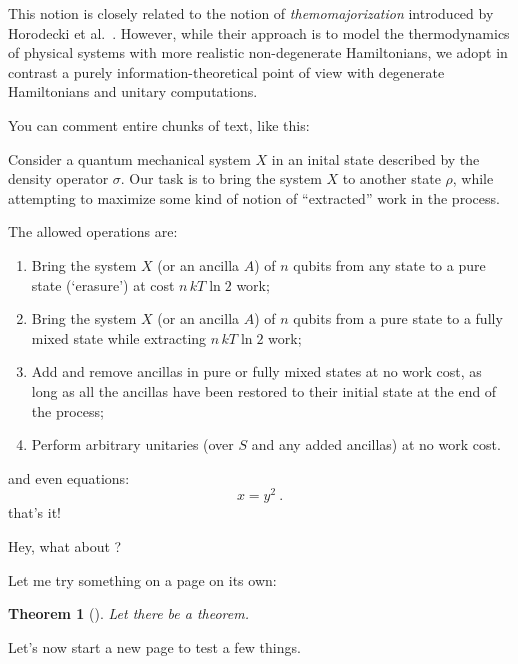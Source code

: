 \documentclass[10pt,a4paper,aps,reprint,notitlepage,nofootinbib]{revtex4-1}
\newtheorem{theorem}{Theorem}
\begin{document}
This notion is closely related to the notion of {\em themomajorization}
introduced by Horodecki et al.~\cite{Horodecki2013_ThermoMaj}. However, while
their approach is to model the thermodynamics of physical systems with more
realistic non-degenerate Hamiltonians, we adopt in contrast a purely
information-theoretical point of view with degenerate Hamiltonians and unitary
computations.

\phf* You can comment entire chunks of text, like this:

Consider a quantum mechanical system $X$ in an inital state described by the
density operator $\sigma$.  
 Our task is to bring the system $X$ to another state $\rho$,
while attempting to maximize some kind of notion of ``extracted'' work in the
process.

The allowed operations are:
\begin{enumerate}[label=(\alph*)]
\item Bring the system $X$ (or an ancilla $A$) of $n$ qubits from any state to a pure state (`erasure') at
  cost $n\,kT\ln 2$ work;
\item Bring the system $X$ (or an ancilla $A$) of $n$ qubits from a pure state to a fully mixed state while
  extracting $n\,kT\ln 2$ work;
\item Add and remove ancillas in pure or fully mixed states at no work cost, as long as all the ancillas have
  been restored to their initial state at the end of the process;
\item Perform arbitrary unitaries (over $S$ and any added ancillas) at no work cost.
\end{enumerate}

and even equations:
\begin{equation}
  x = y^2\ .
\end{equation}
that's it! \endphf

Hey, what about ?




\clearpage
Let me try something on a page on its own:
\begin{theorem}[]
  Let there be a theorem.
\end{theorem}


\clearpage
\onecolumngrid
Let's now start a new page to test a few things.
\end{document}
